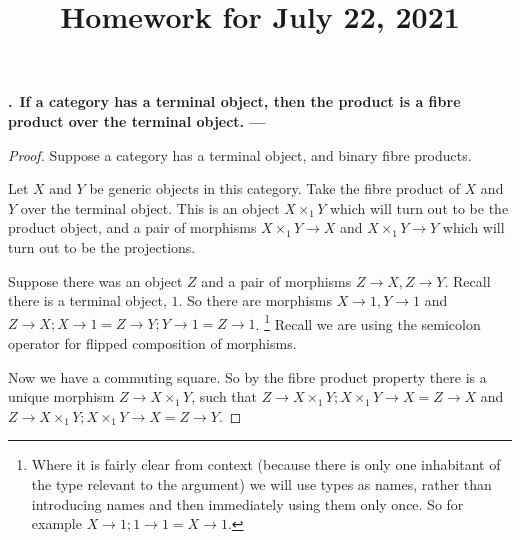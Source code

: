 \documentclass[11pt,noamsfonts]{amsart}
\title{Homework for July 22, 2021}
\newcommand{\pointheader}{\vspace{2mm}\noindent\refstepcounter{section}\textbf{\thesection.}}
\newcommand{\tpoint}[1]{\pointheader~{\bf #1. ---}}
\newcommand{\bpoint}[1]{\pointheader~{\bf #1.}}
\begin{document}
\maketitle


\tpoint{If a category has a terminal object, then the product is a fibre product over the terminal object}
\begin{proof}
Suppose a category has a terminal object, and binary fibre products.

Let \(X\) and \(Y\) be generic objects in this category. Take the fibre product of \(X\) and \(Y\) over the terminal object. This is an object \( X \times_1 Y \) which will turn out to be the product object,
and a pair of morphisms \(X \times_{1} Y \to X\) and \(X \times_{1} Y \to Y\) which will turn out to be the projections.


Suppose there was an object \( Z \) and a pair of morphisms \(Z \to X, Z \to Y \).
Recall there is a terminal object, \( 1 \). So there are morphisms \( X \to 1, Y \to 1 \) and \( Z \to X ; X \to 1 = Z \to Y ; Y \to 1 = Z \to 1 \). \footnote{Where it is fairly clear from context (because there is only one inhabitant of the type relevant to the argument) we will use types as names, rather than introducing names and then immediately using them only once. So for example \( X \to 1 ; 1 \to 1 = X \to 1 \).}
Recall we are using the semicolon operator for flipped composition of morphisms.

Now we have a commuting square. So by the fibre product property there is a unique morphism \( Z \to X \times_1 Y \), such that \(Z \to X \times_1 Y ; X \times_{1} Y \to X = Z \to X\) and \( Z \to X \times_1 Y ; X \times_{1} Y \to X = Z \to Y \).


\end{proof}
\end{document}
